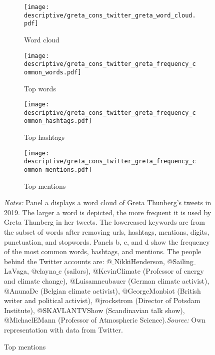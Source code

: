 


\begin{landscape}
	\vspace*{\fill}
	\begin{figure}[H]
		\centering
		\caption{Most widely used words, hashtags, and mentions in Greta Thunberg's tweets}
		\label{fig_greta_cons:twitter_greta_thunberg_top_words_hashtags_mentions}
		
		\begin{subfigure}[h]{0.4\linewidth}\centering\caption{Word cloud}
			\texttt{[image: descriptive/greta\_cons\_twitter\_greta\_word\_cloud.pdf]}
		\end{subfigure}
		\begin{subfigure}[h]{0.4\linewidth}\centering\caption{Top words}
			\texttt{[image: descriptive/greta\_cons\_twitter\_greta\_frequency\_common\_words.pdf]}
		\end{subfigure}
	
		\begin{subfigure}[h]{0.4\linewidth}\centering\caption{Top hashtags}
			\texttt{[image: descriptive/greta\_cons\_twitter\_greta\_frequency\_common\_hashtags.pdf]}
		\end{subfigure}
		\begin{subfigure}[h]{0.4\linewidth}\centering\caption{Top mentions}
			\texttt{[image: descriptive/greta\_cons\_twitter\_greta\_frequency\_common\_mentions.pdf]}
		\end{subfigure}
		\scriptsize
		\begin{minipage}{0.95\linewidth}
			\scriptsize{\emph{Notes:} Panel a displays a word cloud of Greta Thunberg's tweets in 2019. The larger a word is depicted, the more frequent it is used by Greta Thunberg in her tweets. The lowercased keywords are from the subset of words after removing urls, hashtags, mentions, digits, punctuation, and stopwords. Panels b, c, and d show the frequency of the most common words, hashtags, and mentions. The people behind the Twitter accounts are: @$\_$NikkiHenderson, @Sailing$\_$LaVaga, @elayna$\_$c (sailors), @KevinClimate (Professor of energy and climate change), @Luisamneubauer (German climate activist), @AnunaDe (Belgian climate activist), @GeorgeMonbiot (British writer and political activist), @jrockstrom (Director of Potsdam Institute), @SKAVLANTVShow (Scandinavian talk show), @MichaelEMann (Professor of Atmospheric Science).\newline\emph{Source:} Own representation with data from Twitter.}
		\end{minipage}
	\end{figure}
	\vspace*{\fill}\clearpage
\end{landscape}
